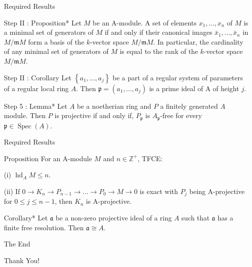 \documentclass[
	11pt, %
]{beamer}
\newcommand{\Z}{\mathbb{Z}}                          %
\begin{document}
\begin{frame}{Required Results}
\small{
\begin{block}{Step II : Proposition*}
    Let $M$ be an A-module. A set of elements $x_{1}, \ldots, x_{n}$ of $M$ is a minimal set of generators of $M$ if and only if their canonical images $\bar{x}_{1}, \ldots, \bar{x}_{n}$ in $M / \mathfrak{m} M$ form a basis of the $k$-vector space $M / \mathfrak{m} M$. In particular, the cardinality of any minimal set of generators of $M$ is equal to the rank of the $k$-vector space $M / \mathfrak{m} M$.
\end{block}

\begin{block}{Step II : Corollary}
    Let $\left\{a_{1}, \ldots, a_{j}\right\}$ be a part of a regular system of parameters of a regular local ring $A$. Then $\mathfrak{p}=\left(a_{1}, \ldots, a_{j}\right)$ is a prime ideal of A of height $j$. 
\end{block}
\begin{block}{Step 5 : Lemma*}
  Let $A$ be a noetherian ring and $P$ a finitely generated $A$ module. Then $P$ is projective if and only if, $P_{\mathfrak{p}}$ is $A_{\mathfrak{p}}$-free for every $\mathfrak{p} \in \operatorname{Spec}(A)$.
\end{block}
}
\end{frame}

\begin{frame}{Required Results}
\small{
\begin{block}{Proposition}
For an A-module $M$ and $n \in \Z^{+}$, TFCE:

(i) $\operatorname{hd}_{A} M \leq n$.

(ii) If $0 \rightarrow K_{n} \rightarrow P_{n-1} \rightarrow \ldots \rightarrow P_{0} \rightarrow M \rightarrow 0$ is exact with $P_{j}$ being A-projective for $0 \leq j \leq n-1$, then $K_{n}$ is A-projective.
\end{block}
\begin{block}{Corollary*}
   Let $\mathfrak{a}$ be a non-zero projective ideal of a ring $A$ such that $\mathfrak{a}$ has a finite free resolution. Then $\mathfrak{a}\cong A$.
\end{block}
}
\end{frame}


\begin{frame}{The End}
\begin{center}
    \Large{Thank You!}
\end{center}
\end{frame}
\end{document}

